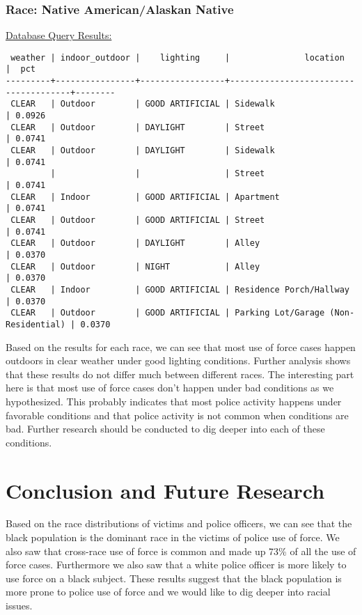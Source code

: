 \documentclass[10pt]{article}
\begin{document}
\subsubsection*{Race: Native American/Alaskan Native}

\underline{Database Query Results:}

\begin{verbatim}
 weather | indoor_outdoor |    lighting     |               location               |  pct
---------+----------------+-----------------+--------------------------------------+--------
 CLEAR   | Outdoor        | GOOD ARTIFICIAL | Sidewalk                             | 0.0926
 CLEAR   | Outdoor        | DAYLIGHT        | Street                               | 0.0741
 CLEAR   | Outdoor        | DAYLIGHT        | Sidewalk                             | 0.0741
         |                |                 | Street                               | 0.0741
 CLEAR   | Indoor         | GOOD ARTIFICIAL | Apartment                            | 0.0741
 CLEAR   | Outdoor        | GOOD ARTIFICIAL | Street                               | 0.0741
 CLEAR   | Outdoor        | DAYLIGHT        | Alley                                | 0.0370
 CLEAR   | Outdoor        | NIGHT           | Alley                                | 0.0370
 CLEAR   | Indoor         | GOOD ARTIFICIAL | Residence Porch/Hallway              | 0.0370
 CLEAR   | Outdoor        | GOOD ARTIFICIAL | Parking Lot/Garage (Non-Residential) | 0.0370
\end{verbatim}

Based on the results for each race, we can see that most use of force cases happen outdoors in clear weather under good lighting conditions. Further analysis shows that these results do not differ much between different races. The interesting part here is that most use of force cases don't happen under bad conditions as we hypothesized. This probably indicates that most police activity happens under favorable conditions and that police activity is not common when conditions are bad. Further research should be conducted to dig deeper into each of these conditions.


\section*{Conclusion and Future Research}

Based on the race distributions of victims and police officers, we can see that the black population is the dominant race in the victims of police use of force. We also saw that cross-race use of force is common and made up 73\% of all the use of force cases. Furthermore we also saw that a white police officer is more likely to use force on a black subject. These results suggest that the black population is more prone to police use of force and we would like to dig deeper into racial issues.
\end{document}
